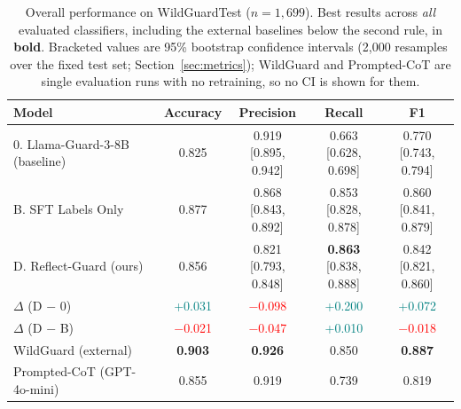 \documentclass[superintelligence,article,submit,pdftex,moreauthors]{Definitions/mdpi}
\begin{document}
\begin{table}[H]
  \caption{Overall performance on WildGuardTest ($n = 1{,}699$). Best results across \emph{all} evaluated classifiers, including the external baselines below the second rule, in \textbf{bold}. Bracketed values are 95\% bootstrap confidence intervals (2{,}000 resamples over the fixed test set; Section~\ref{sec:metrics}); WildGuard and Prompted-CoT are single evaluation runs with no retraining, so no CI is shown for them.\label{tab:wildguard_main}}
  \centering
  \small
  \begin{tabular}{lcccc}
    \toprule
    Model & Accuracy & Precision & Recall & F1 \\
    \midrule
    0. Llama-Guard-3-8B (baseline)
      & 0.825
      & \makecell{0.919\\{[0.895, 0.942]}}
      & \makecell{0.663\\{[0.628, 0.698]}}
      & \makecell{0.770\\{[0.743, 0.794]}} \\

    B. SFT Labels Only
      & 0.877
      & \makecell{0.868\\{[0.843, 0.892]}}
      & \makecell{0.853\\{[0.828, 0.878]}}
      & \makecell{0.860\\{[0.841, 0.879]}} \\

    D. Reflect-Guard (ours)
      & 0.856
      & \makecell{0.821\\{[0.793, 0.848]}}
      & \makecell{\textbf{0.863}\\{[0.838, 0.888]}}
      & \makecell{0.842\\{[0.821, 0.860]}} \\

    \midrule
    $\Delta$ (D $-$ 0)
      & \textcolor{teal}{+0.031}
      & \textcolor{red}{$-$0.098}
      & \textcolor{teal}{+0.200}
      & \textcolor{teal}{+0.072} \\

    $\Delta$ (D $-$ B)
      & \textcolor{red}{$-$0.021}
      & \textcolor{red}{$-$0.047}
      & \textcolor{teal}{+0.010}
      & \textcolor{red}{$-$0.018} \\

    \midrule
    WildGuard (external)
      & \textbf{0.903}
      & \textbf{0.926}
      & 0.850
      & \textbf{0.887} \\

    Prompted-CoT (GPT-4o-mini)
      & 0.855
      & 0.919
      & 0.739
      & 0.819 \\

    \bottomrule
  \end{tabular}
\end{table}
\end{document}
